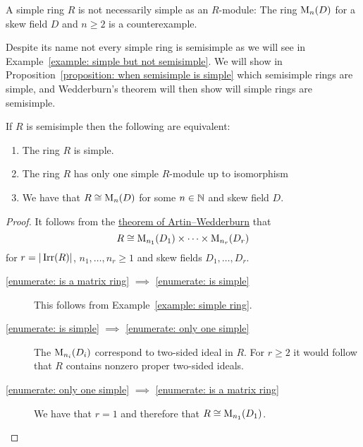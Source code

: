 \begin{warning}
  A simple ring $R$ is not necessarily simple as an $R$-module:
  The ring $\operatorname{M}_n(D)$ for a skew field $D$ and $n \geq 2$ is a counterexample.
\end{warning}


\begin{fluff}
  Despite its name not every simple ring is semisimple as we will see in Example~\ref{example: simple but not semisimple}.
  We will show in Proposition~\ref{proposition: when semisimple is simple} which semisimple rings are simple, and Wedderburn’s theorem will then show will simple rings are semisimple.
\end{fluff}


\begin{proposition}
  \label{proposition: when semisimple is simple}
  If $R$ is semisimple then the following are equivalent:
  \begin{enumerate}
    \item
      \label{enumerate: is simple}
      The ring $R$ is simple.
    \item
      \label{enumerate: only one simple}
      The ring $R$ has only one simple $R$-module up to isomorphism
    \item
      \label{enumerate: is a matrix ring}
      We have that $R \cong \operatorname{M}_n(D)$ for some $n \in \mathbb{N}$ and skew field $D$.
  \end{enumerate}
\end{proposition}


\begin{proof}
  It follows from the \hyperref[theorem: artin wedderburn theorem]{theorem of Artin--Wedderburn} that
  \[
    R \cong \operatorname{M}_{n_1}(D_1) \times \dotsb \times \operatorname{M}_{n_r}(D_r)
  \]
  for $r = |\operatorname{Irr}(R)|$, $n_1, \dotsc, n_r \geq 1$ and skew fields $D_1, \dotsc, D_r$.
  
  \begin{description}
    \item[\ref*{enumerate: is a matrix ring} $\implies$ \ref*{enumerate: is simple}]
      This follows from Example~\ref{example: simple ring}.
    \item[\ref*{enumerate: is simple} $\implies$ \ref*{enumerate: only one simple}]
      The $\operatorname{M}_{n_i}(D_i)$ correspond to two-sided ideal in $R$.
      For $r \geq 2$ it would follow that $R$ contains nonzero proper two-sided ideals.
    \item[\ref*{enumerate: only one simple} $\implies$ \ref*{enumerate: is a matrix ring}]
      We have that $r = 1$ and therefore that $R \cong \operatorname{M}_{n_1}(D_1)$.
    \qedhere
  \end{description}
\end{proof}


